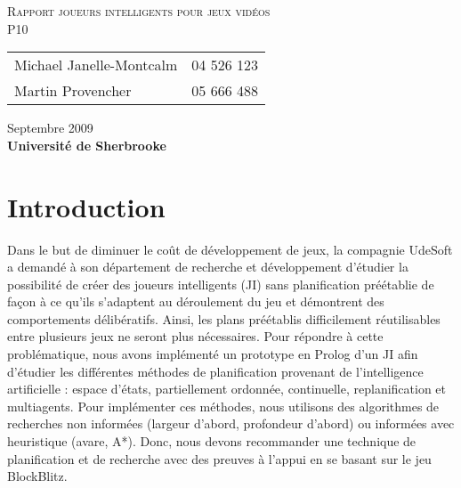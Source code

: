 \documentclass[12pt,letterpaper]{article}
\begin{document}
\renewcommand{\labelitemi}{$\bullet$}
\newcommand{\unit}[1]{\ \mathrm{#1}}
\newcommand{\degree}{\ensuremath{^\circ}}
\newcommand{\action}[3]
{
\textit{Action}( {#1} ) \\
\hspace{20pt} PRECOND: {#2} \\
\hspace{20pt} EFFECT: {#3} \\
}

\thispagestyle{empty}
\begin{center}
	\vspace{20pt}
	\large{\textsc{
		Rapport joueurs intelligents pour jeux vidéos\\
	}}
	\vspace{20pt}
	\large{\textsc{
		P10
	}}
	\vfill
	\begin{tabular}{ll}
	  Michael Janelle-Montcalm & 04 526 123 \\
	  Martin Provencher &	05 666 488 \\
	\end{tabular}
	\vfill
	Septembre 2009 \\
	\textbf{Université de Sherbrooke}
	\vspace{20pt}
\end{center}
\clearpage
\begin{spacing}{0.1}
\tableofcontents
\end{spacing}
\clearpage

\section{Introduction} %

Dans le but de diminuer le coût de développement de jeux, la compagnie UdeSoft a demandé à son département de recherche et développement d'étudier la possibilité de créer des joueurs intelligents (JI) sans planification préétablie de façon à ce qu'ils s'adaptent au déroulement du jeu et démontrent des comportements délibératifs. Ainsi, les plans préétablis difficilement réutilisables entre plusieurs jeux ne seront plus nécessaires. Pour répondre à cette problématique, nous avons implémenté un prototype en Prolog d'un JI afin d'étudier les différentes méthodes de planification provenant de l'intelligence artificielle : espace d'états, partiellement ordonnée, continuelle, replanification et multiagents. Pour implémenter ces méthodes, nous utilisons des algorithmes de recherches non informées (largeur d'abord, profondeur d'abord) ou informées avec heuristique (avare, A*). Donc, nous devons recommander une technique de planification et de recherche avec des preuves à l'appui en se basant sur le jeu BlockBlitz.
\end{document}
